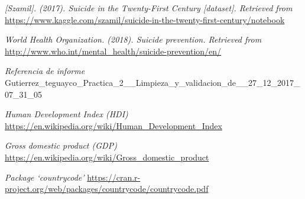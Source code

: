 \documentclass[]{article}
\begin{document}
\emph{{[}Szamil{]}. (2017). Suicide in the Twenty-First Century
{[}dataset{]}. Retrieved from}
\url{https://www.kaggle.com/szamil/suicide-in-the-twenty-first-century/notebook}

\emph{World Health Organization. (2018). Suicide prevention. Retrieved
from}\\
\url{http://www.who.int/mental_health/suicide-prevention/en/}

\emph{Referencia de informe}\\
Gutierrez\_teguayco\_Practica\_2\_\_Limpieza\_y\_validacion\_de\_\_27\_12\_2017\_07\_31\_05

\emph{Human Development Index (HDI)}\\
\url{https://en.wikipedia.org/wiki/Human_Development_Index}

\emph{Gross domestic product (GDP)}\\
\url{https://en.wikipedia.org/wiki/Gross_domestic_product}

\emph{Package `countrycode'}
\url{https://cran.r-project.org/web/packages/countrycode/countrycode.pdf}
\end{document}
